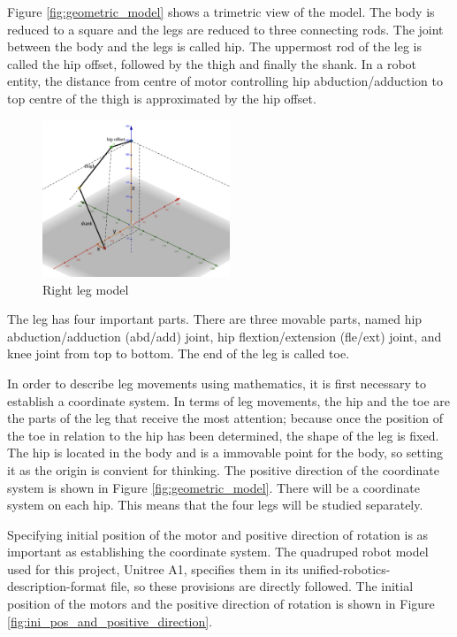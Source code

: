 Figure \ref{fig:geometric_model} shows a trimetric view of the model. The body is reduced to a square and the legs are reduced to three connecting rods. The joint between the body and the legs is called hip. The uppermost rod of the leg is called the hip offset, followed by the thigh and finally the shank. In a robot entity, the distance from centre of motor controlling hip abduction/adduction to top centre of the thigh is approximated by the hip offset.

\begin{figure}[htbp]
   \centering
   \includegraphics[width=0.5\textwidth]{figures/right_leg_model.jpg}
   \caption{Right leg model}
   \label{fig:right_leg_model}
\end{figure}

The leg has four important parts. There are three movable parts, named hip abduction/adduction (abd/add) joint, hip flextion/extension (fle/ext) joint, and knee joint from top to bottom. The end of the leg is called toe.

In order to describe leg movements using mathematics, it is first necessary to establish a coordinate system. In terms of leg movements, the hip and the toe are the parts of the leg that receive the most attention; because once the position of the toe in relation to the hip has been determined, the shape of the leg is fixed. The hip is located in the body and is a immovable point for the body, so setting it as the origin is convient for thinking. The positive direction of the coordinate system is shown in Figure \ref{fig:geometric_model}. There will be a coordinate system on each hip. This means that the four legs will be studied separately.

Specifying initial position of the motor and positive direction of rotation is as important as establishing the coordinate system. The quadruped robot model used for this project, Unitree A1, specifies them in its unified-robotics-description-format file, so these provisions are directly followed. The initial position of the motors and the positive direction of rotation is shown in Figure \ref{fig:ini_pos_and_positive_direction}.

